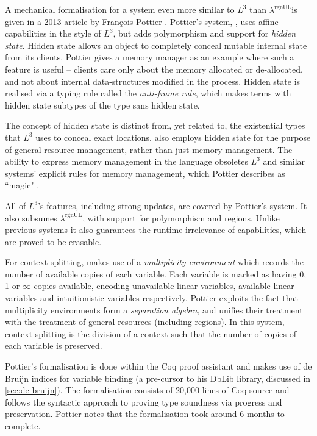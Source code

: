 \documentclass[]{unswthesis}
\newcommand{\rgnUL}{$\lambda^\text{rgnUL}$\text{ }}
\newcommand{\SSPHS}{\text{SSPHS }}
\newcommand{\Francois}{Fran\frenchc{c}ois }
\let\frenchc\c
\let\c\texttt
\let\i\textit
\begin{document}
A mechanical formalisation for a system even more similar to $L^3$ than \rgnUL is given in a 2013 article by \Francois Pottier \cite{pottier13}. Pottier's system, \SSPHS, uses affine capabilities in the style of $L^3$, but adds polymorphism and support for \i{hidden state}. Hidden state allows an object to completely conceal mutable internal state from its clients. Pottier gives a memory manager as an example where such a feature is useful -- clients care only about the memory allocated or de-allocated, and not about internal data-structures modified in the process. Hidden state is realised via a typing rule called the \i{anti-frame rule}, which makes terms with hidden state subtypes of the type sans hidden state.

The concept of hidden state is distinct from, yet related to, the existential types that $L^3$ uses to conceal exact locations. \SSPHS also employs hidden state for the purpose of general resource management, rather than just memory management. The ability to express memory management in the language obsoletes $L^3$ and similar systems' explicit rules for memory management, which Pottier describes as ``magic" \cite{pottier13}.

All of $L^3$'s features, including strong updates, are covered by Pottier's system. It also subsumes \rgnUL, with support for polymorphism and regions. Unlike previous systems it also guarantees the runtime-irrelevance of capabilities, which are proved to be erasable.

For context splitting, \SSPHS makes use of a \i{multiplicity environment} which records the number of available copies of each variable. Each variable is marked as having 0, 1 or $\infty$ copies available, encoding unavailable linear variables, available linear variables and intuitionistic variables respectively. Pottier exploits the fact that multiplicity environments form a \i{separation algebra}, and unifies their treatment with the treatment of general resources (including regions). In this system, context splitting is the division of a context such that the number of copies of each variable is preserved.

Pottier's formalisation is done within the Coq proof assistant and makes use of de Bruijn indices for variable binding (a pre-cursor to his DbLib library, discussed in \cref{sec:de-bruijn}). The formalisation consists of 20,000 lines of Coq source and follows the syntactic approach to proving type soundness via progress and preservation. Pottier notes that the formalisation took around 6 months to complete.
\end{document}
